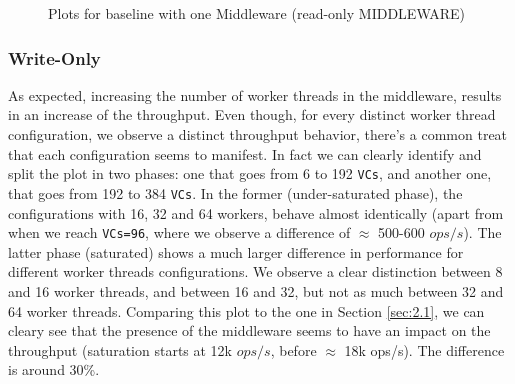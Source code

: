 \documentclass[11pt,a4paper]{article}
\begin{document}
\begin{figure}[!h]
  \centering
    \caption{Plots for baseline with one Middleware (read-only MIDDLEWARE)}
  \label{fig:baseline_mw_1_mw_mw_ro}
\end{figure}

\subsubsection*{Write-Only}

As expected, increasing the number of worker threads in the middleware, results in an increase of the throughput. Even though, for every distinct worker thread configuration, we observe a distinct throughput behavior, there's a common treat that each configuration seems to manifest. In fact we can clearly identify and split the plot in two phases: one that goes from 6 to 192 \texttt{VCs}, and another one, that goes from 192 to 384 \texttt{VCs}. 
In the former (under-saturated phase), the configurations with 16, 32 and 64 workers, behave almost identically (apart from when we reach \texttt{VCs=96}, where we observe a difference of $\approx$ 500-600 $ops/s$).
The latter phase (saturated) shows a much larger difference in performance for different worker threads configurations. We observe a clear distinction between 8 and 16 worker threads, and between 16 and 32, but not as much between 32 and 64 worker threads. 
Comparing this plot to the one in Section \ref{sec:2.1}, we can cleary see that the presence of the middleware seems to have an impact on the throughput (saturation starts at 12k $ops/s$, before $\approx$ 18k ops/s). The difference is around 30\%.
\end{document}
